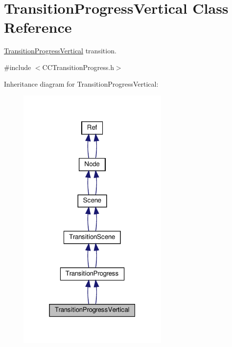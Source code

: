 \hypertarget{classTransitionProgressVertical}{}\section{Transition\+Progress\+Vertical Class Reference}
\label{classTransitionProgressVertical}


\hyperlink{classTransitionProgressVertical}{Transition\+Progress\+Vertical} transition.  




{\ttfamily \#include $<$C\+C\+Transition\+Progress.\+h$>$}



Inheritance diagram for Transition\+Progress\+Vertical\+:
\nopagebreak
\begin{figure}[H]
\begin{center}
\leavevmode
\includegraphics[width=211pt]{classTransitionProgressVertical__inherit__graph}
\end{center}
\end{figure}


